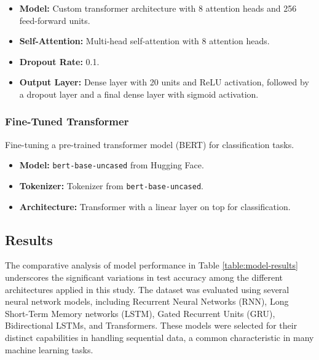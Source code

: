 \documentclass{article}
\begin{document}
\begin{itemize}
    \item \textbf{Model:} Custom transformer architecture with 8 attention heads and 256 feed-forward units.
    \item \textbf{Self-Attention:} Multi-head self-attention with 8 attention heads.
    \item \textbf{Dropout Rate:} 0.1.
    \item \textbf{Output Layer:} Dense layer with 20 units and ReLU activation, followed by a dropout layer and a final dense layer with sigmoid activation.
\end{itemize}

\subsubsection{Fine-Tuned Transformer}
Fine-tuning a pre-trained transformer model (BERT) for classification tasks.

\begin{itemize}
    \item \textbf{Model:} \texttt{bert-base-uncased} from Hugging Face.
    \item \textbf{Tokenizer:} Tokenizer from \texttt{bert-base-uncased}.
    \item \textbf{Architecture:} Transformer with a linear layer on top for classification.
\end{itemize}

\subsection{Results}
The comparative analysis of model performance in Table \ref{table:model-results} underscores the significant variations in test accuracy among the different architectures applied in this study. The dataset was evaluated using several neural network models, including Recurrent Neural Networks (RNN), Long Short-Term Memory networks (LSTM), Gated Recurrent Units (GRU), Bidirectional LSTMs, and Transformers. These models were selected for their distinct capabilities in handling sequential data, a common characteristic in many machine learning tasks.
\end{document}
